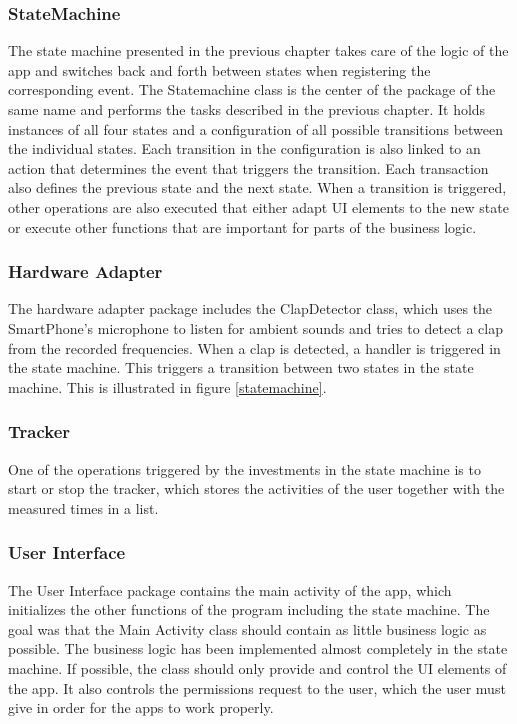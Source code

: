 \subsubsection{StateMachine}
\label{sec:org9ea54c6}

The state machine presented in the previous chapter takes care of the logic 
of the app and switches back and forth between states when registering the corresponding event. 
The Statemachine class is the center of the package of the same name and performs the tasks described in the previous chapter.
It holds instances of all four states and a configuration of all possible transitions between the individual states.
Each transition in the configuration is also linked to an action that determines the event that triggers 
the transition. Each transaction also defines the previous state and the next state.
When a transition is triggered, other operations are also executed that either adapt UI elements to the new 
state or execute other functions that are important for parts of the business logic.

\subsubsection{Hardware Adapter}
\label{sec:org0a1c43f}
The hardware adapter package includes the ClapDetector class, which uses the SmartPhone's microphone to listen 
for ambient sounds and tries to detect a clap from the recorded frequencies. When a clap is detected, 
a handler is triggered in the state machine. This triggers a transition between two states in the state machine.
This is illustrated in figure \ref{statemachine}.

\subsubsection{Tracker}
\label{sec:orgd2cdde2}

One of the operations triggered by the investments in the state machine is to start or stop the tracker, 
which stores the activities of the user together with the measured times in a list.

\subsubsection{User Interface}
\label{sec:org2938786}

The User Interface package contains the main activity of the app, which initializes the other functions of 
the program including the state machine. The goal was that the Main Activity class should contain as little 
business logic as possible. The business logic has been implemented almost completely in the state machine. 
If possible, the class should only provide and control the UI elements of the app. It also controls the permissions 
request to the user, which the user must give in order for the apps to work properly.

